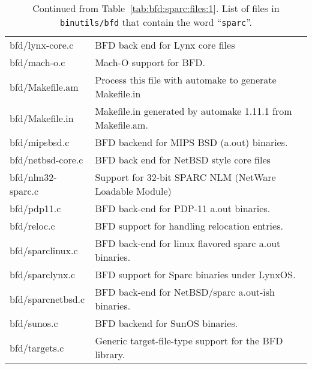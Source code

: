 \begin{table}[ht]
  \centering
  \begin{tabular}[h]{|p{.3\linewidth}|p{.7\linewidth}|}
\hline
bfd/lynx-core.c       &  BFD back end for Lynx core files \\
bfd/mach-o.c          &  Mach-O support for BFD. \\
bfd/Makefile.am       &  Process this file with automake to generate Makefile.in \\
bfd/Makefile.in       &  Makefile.in generated by automake 1.11.1 from Makefile.am. \\
bfd/mipsbsd.c         &  BFD backend for MIPS BSD (a.out) binaries. \\
bfd/netbsd-core.c     &  BFD back end for NetBSD style core files \\
bfd/nlm32-sparc.c     &  Support for 32-bit SPARC NLM (NetWare Loadable Module) \\
bfd/pdp11.c           &  BFD back-end for PDP-11 a.out binaries. \\
bfd/reloc.c           &  BFD support for handling relocation entries. \\
bfd/sparclinux.c      &  BFD back-end for linux flavored sparc a.out binaries. \\
bfd/sparclynx.c       &  BFD support for Sparc binaries under LynxOS. \\
bfd/sparcnetbsd.c     &  BFD back-end for NetBSD/sparc a.out-ish binaries. \\
bfd/sunos.c           &  BFD backend for SunOS binaries. \\
bfd/targets.c         &  Generic target-file-type support for the BFD library. \\
\hline
\end{tabular}
\caption[List of files 2]{Continued from
  Table~\ref{tab:bfd:sparc:files:1}. List of files in
  \texttt{binutils/bfd} that contain the word ``\texttt{sparc}''.}
\label{tab:bfd:sparc:files:2}
\end{table}

